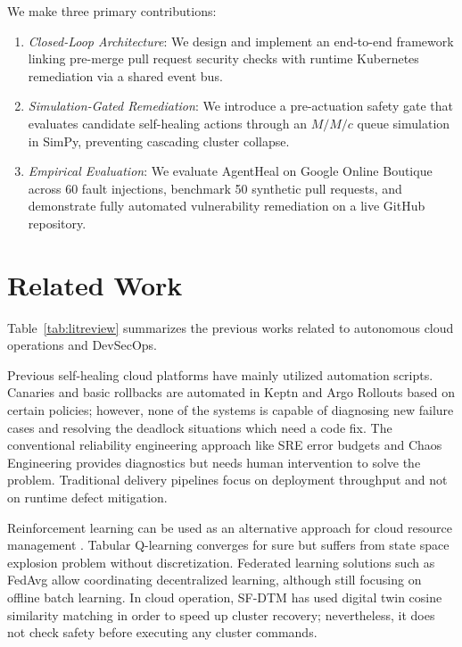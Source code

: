 \documentclass[10pt,conference]{IEEEtran}
\begin{document}
We make three primary contributions:
\begin{enumerate}
\item \textit{Closed-Loop Architecture}: We design and implement an end-to-end framework linking pre-merge pull request security checks with runtime Kubernetes remediation via a shared event bus.
\item \textit{Simulation-Gated Remediation}: We introduce a pre-actuation safety gate that evaluates candidate self-healing actions through an $M/M/c$ queue simulation in SimPy, preventing cascading cluster collapse.
\item \textit{Empirical Evaluation}: We evaluate AgentHeal on Google Online Boutique across 60 fault injections, benchmark 50 synthetic pull requests, and demonstrate fully automated vulnerability remediation on a live GitHub repository.
\end{enumerate}

\section{Related Work}

Table~\ref{tab:litreview} summarizes the previous works related to autonomous cloud operations and DevSecOps.

Previous self-healing cloud platforms have mainly utilized automation scripts. Canaries and basic rollbacks are automated in Keptn \cite{keptn} and Argo Rollouts \cite{argorollouts} based on certain policies; however, none of the systems is capable of diagnosing new failure cases and resolving the deadlock situations which need a code fix. The conventional reliability engineering approach like SRE error budgets \cite{sre} and Chaos Engineering \cite{chaoseng} provides diagnostics but needs human intervention to solve the problem. Traditional delivery pipelines \cite{humblefarley,fowlerbg} focus on deployment throughput and not on runtime defect mitigation.

Reinforcement learning can be used as an alternative approach for cloud resource management \cite{marl}. Tabular Q-learning \cite{qlearning} converges for sure but suffers from state space explosion problem without discretization. Federated learning solutions such as FedAvg \cite{fedavg} allow coordinating decentralized learning, although still focusing on offline batch learning. In cloud operation, SF-DTM \cite{sfdtm} has used digital twin cosine similarity matching in order to speed up cluster recovery; nevertheless, it does not check safety before executing any cluster commands.
\end{document}
